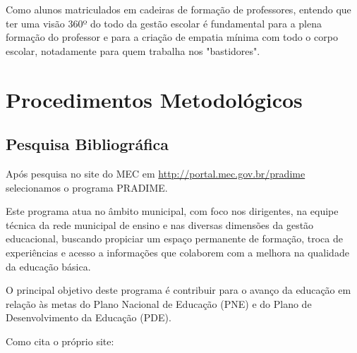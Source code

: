 \documentclass[
	12pt,				%
	openright,			%
	oneside,
	a4paper,			%
	chapter=TITLE,		%
	section=TITLE,		%
	sumario=abnt-6027-2012,
	english,			%
	brazil				%
]{abntex2}
\begin{document}
	Como alunos matriculados em cadeiras de formação de professores, entendo que ter uma visão 360º do todo da gestão escolar é fundamental para a plena formação do professor e para a criação de empatia mínima com todo o corpo escolar, notadamente para quem trabalha nos "bastidores".
	
	
			
\chapter{Procedimentos Metodológicos}

	\section{Pesquisa Bibliográfica} 

		Após pesquisa no site do MEC em \url{http://portal.mec.gov.br/pradime} selecionamos o programa PRADIME.

		Este programa atua no âmbito municipal, com foco nos dirigentes, na equipe técnica da rede municipal de ensino e nas diversas dimensões da gestão educacional, buscando propiciar um espaço permanente de formação, troca de experiências e acesso a informações que colaborem com a melhora na qualidade da educação básica.
		
		O principal objetivo deste programa é contribuir para o avanço da educação em relação às metas do Plano Nacional de Educação (PNE) e do Plano de Desenvolvimento da Educação (PDE).

		Como cita o próprio site:
		
\end{document}
